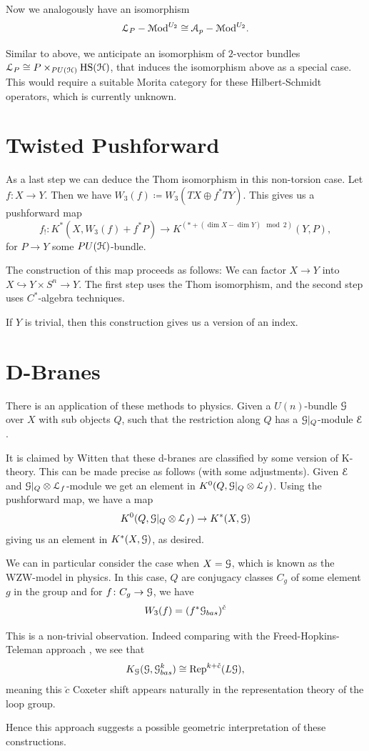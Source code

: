 \documentclass[10pt]{amsart}
\begin{document}
Now we analogously have an isomorphism 
\[\mathcal{L}_P-\mathcal{M}\mathrm{od}^{U_2} \cong \mathcal{A}_p- \mathcal{M}\mathrm{od}^{U_2}. \]

\begin{remark}
	Similar to above, we anticipate an isomorphism	of $2$-vector bundles $\mathcal{L}_P \cong P \times_{PU(\mathcal{H})} \mathrm{HS}(\mathcal{H})$, that induces the isomorphism above as a special case. This would require a suitable Morita category for these Hilbert-Schmidt operators, which is currently unknown.
\end{remark}

\section{Twisted Pushforward}
As a last step we can deduce the Thom	isomorphism in this non-torsion case. 
Let $f\colon X \to Y$. Then we have $W_3(f) \coloneq W_3(TX \oplus f^* TY)$. This gives us a pushforward map 
\[f_!\colon K^*(X,W_3(f) + f^*P) \to K^{(*  + (\dim X - \dim Y) \mod 2)}(Y,P), \]
for $P \to Y$ some $PU(\mathcal{H})$-bundle.

The construction of this map proceeds as follows: We can factor $X \to Y$ into $X \hookrightarrow Y \times S^n \to Y$. The first step uses the Thom isomorphism, and the second step uses $C^*$-algebra techniques.

\begin{remark}
 If $Y$ is trivial, then this construction gives us a version of an index. 
\end{remark}

\section{D-Branes}
	There is an application of these methods to physics. Given a $U(n)$-bundle $\mathcal{G}$ over $X$ with sub objects $Q$, such that the restriction along $Q$ has a  $\mathcal{G}|_Q$-module $\mathcal{E}$.

	It is claimed by Witten that these d-branes are classified by some version of K-theory. This can be made precise as follows (with some adjustments). Given $\mathcal{E}$ and $\mathcal{G}|_Q \otimes \mathcal{L}_f$-module we get an element in  $K^0(Q, \mathcal{G}|_Q \otimes \mathcal{L}_f)$. Using the pushforward map, we have a map
	\[K^0(Q, \mathcal{G}|_Q \otimes \mathcal{L}_f) \to K^*(X,\mathcal{G}) \] 
giving us an element	in $K^*(X,\mathcal{G})$, as desired.

We can in particular consider the case when $X = \mathcal{G}$, which is known as the WZW-model in physics. In this case, $Q$ are conjugacy classes $C_g$ of some element $g$ in the group and for $f\colon C_g \to \mathcal{G}$, we have 
\[W_3(f) = (f^* \mathcal{G}_{bas})^{\check{c}}\]  
	
This is a non-trivial observation. Indeed comparing with the Freed-Hopkins-Teleman approach \cite{freedhopkinsteleman2011loopgroupsi}, we see that 
\[K_{\mathcal{G}}(\mathcal{G}, \mathcal{G}^k_{bas}) \cong \mathrm{Rep}^{k + \check{c}}(L\mathcal{G}), \]
meaning this $\check{c}$ Coxeter shift appears naturally	in the representation theory of the loop group. 

Hence this approach suggests a possible geometric interpretation of these constructions.

{\footnotesize
 
 
}
\end{document}
